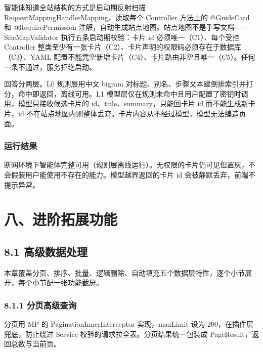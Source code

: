 \documentclass[zihao=-4,UTF8,openany]{ctexart}
\renewcommand{\_}{\textunderscore\allowbreak}
\begin{document}
智能体知道全站结构的方式是启动期反射扫描 RequestMappingHandlerMapping，读取每个 Controller 方法上的 @GuideCard 和 @RequirePermission 注解，自动生成站点地图。站点地图不是手写文档——SiteMapValidator 执行五条启动期校验：卡片 id 必须唯一（C1）、每个受控 Controller 整类至少有一张卡片（C2）、卡片声明的权限码必须存在于数据库（C3）、YAML 配置不能凭空新增卡片（C4）、卡片路由非空且唯一（C5）。任何一条不通过，服务拒绝启动。

回答分两层。L0 规则层用中文 bigram 对标题、别名、步骤文本建倒排索引并打分，命中即返回，离线可用。L1 模型层仅在规则未命中且用户配置了密钥时调用，模型只接收候选卡片的 id、title、summary，只能回卡片 id 而不能生成新卡片，id 不在站点地图内则整体丢弃。卡片内容从不经过模型，模型无法编造页面。

\subsubsection*{\texorpdfstring{\textbf{运行结果}}{运行结果}}\label{sec:guide-result}

断网环境下智能体完整可用（规则层离线运行）。无权限的卡片仍可见但置灰，不会假装用户能使用不存在的能力。模型越界返回的卡片 id 会被静默丢弃，前端不提示异常。

\section*{\texorpdfstring{\textbf{八、进阶拓展功能}}{八、进阶拓展功能}}\label{sec:advanced-features}


\subsection*{\texorpdfstring{\textbf{8.1 高级数据处理}}{8.1 高级数据处理}}\label{ux9ad8ux7ea7ux6570ux636eux5904ux7406}

本章覆盖分页、排序、批量、逻辑删除、自动填充五个数据层特性，逐个小节展开，每个小节配一张功能截屏。

\subsubsection*{\texorpdfstring{\textbf{8.1.1 分页高级查询}}{8.1.1 分页高级查询}}\label{sec:page}

分页用 MP 的 PaginationInnerInterceptor 实现，maxLimit 设为 200，在插件层兜底，防止绕过 Service 校验的请求拉全表。分页结果统一包装成 PageResult，返回总数与当前页。
\end{document}
